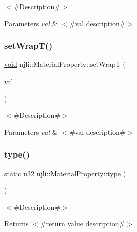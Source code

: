 $<$\#\+Description\#$>$


\begin{DoxyParams}{Parameters}
{\em val} & $<$\#val description\#$>$ \\
\hline
\end{DoxyParams}
\mbox{\label{classnjli_1_1_material_property_a085c669a1f7e6df12a6e8bcabd70a176}} 
\subsubsection{\texorpdfstring{set\+Wrap\+T()}{setWrapT()}}
{\footnotesize\ttfamily \mbox{\hyperlink{_thread_8h_af1e856da2e658414cb2456cb6f7ebc66}{void}} njli\+::\+Material\+Property\+::set\+WrapT (\begin{DoxyParamCaption}\item[{\mbox{\hyperlink{namespacenjli_a6e9496d4850ec7151f04a220e1979b62}{njli\+Texture\+Wrap\+Type}}}]{val }\end{DoxyParamCaption})}

$<$\#\+Description\#$>$


\begin{DoxyParams}{Parameters}
{\em val} & $<$\#val description\#$>$ \\
\hline
\end{DoxyParams}
\mbox{\label{classnjli_1_1_material_property_a4d223566b0ede80d533b50bdbe9e6717}} 
\subsubsection{\texorpdfstring{type()}{type()}}
{\footnotesize\ttfamily static \mbox{\hyperlink{_util_8h_a10e94b422ef0c20dcdec20d31a1f5049}{u32}} njli\+::\+Material\+Property\+::type (\begin{DoxyParamCaption}{ }\end{DoxyParamCaption})\hspace{0.3cm}{\ttfamily [static]}}

$<$\#\+Description\#$>$

\begin{DoxyReturn}{Returns}
$<$\#return value description\#$>$ 
\end{DoxyReturn}
\mbox{\label{classnjli_1_1_material_property_ae15d33487d858135cb0366bc629fe255}} 
